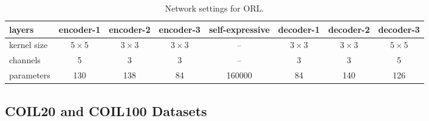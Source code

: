 \documentclass{article}
\begin{document}
\begin{table}[!t]
\centering
\footnotesize
\hspace*{-0.1cm}\begin{tabular}{ | l | c  c  c  c  c  c c | }
\hline
  layers      & encoder-1   & encoder-2  &  encoder-3 & self-expressive & decoder-1  & decoder-2   & decoder-3 \\            
  \hline
kernel size  & $5\times 5$ & $3\times 3$ & $3\times 3$ & -- & $3\times 3$  & $3\times 3$   & $5\times 5$  \\  
channels&  5         &  3         &   3        & -- & 3           &  3           & 5 \\
parameters& 130     & 138   & 84   & 160000  & 84  & 140 & 126 \\
\hline
\end{tabular}
\caption{Network settings for ORL.}
\label{tab:struct-orl}
\vspace{-0.7cm}
\end{table}




\subsection{COIL20 and COIL100 Datasets}
\end{document}
